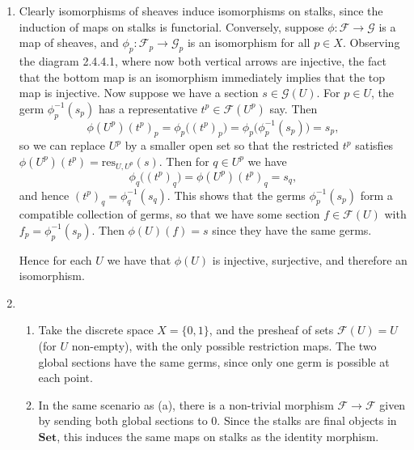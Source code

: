 \documentclass{report}
\newcommand{\cat}[1]{\mathbf{#1}} %
\newcommand{\res}{{\mathrm{res}}} %
\newcommand{\scrF}{\mathscr{F}}
\newcommand{\scrG}{\mathscr{G}}
\begin{document}
\begin{enumerate}[label=\textbf{2.4.\Alph*.}]
	\item Clearly isomorphisms of sheaves induce isomorphisms on stalks, since
	      the induction of maps on stalks is functorial. Conversely, suppose
	      $\phi:\scrF\to\scrG$ is a map of sheaves, and $\phi_p:\scrF_p\to\scrG_p$ is an
	      isomorphism for all $p\in X$. Observing the diagram 2.4.4.1, where now
	      both vertical arrows are injective, the fact that the bottom map is an
	      isomorphism immediately implies that the top map is injective. Now
	      suppose we have a section $s\in\scrG(U)$. For $p\in U$, the germ
	      $\phi_p^{-1}(s_p)$ has a representative $t^p\in\scrF(U^p)$ say. Then
	      \begin{equation*}
		      \phi(U^p)(t^p)_p
		      = \phi_p\bigl((t^p)_p\bigr)
		      = \phi_p\bigl(\phi_p^{-1}(s_p)\bigr)
		      = s_p,
	      \end{equation*}
	      so we can replace $U^p$ by a smaller open set so that the restricted
	      $t^p$ satisfies $\phi(U^p)(t^p)=\res_{U,U^p}(s)$. Then for $q\in U^p$
	      we have
	      \begin{equation*}
		      \phi_q\bigl((t^p)_q\bigr)
		      = \phi(U^p)(t^p)_q
		      = s_q,
	      \end{equation*}
	      and hence $(t^p)_q=\phi_q^{-1}(s_q)$. This shows that the germs
	      $\phi_p^{-1}(s_p)$ form a compatible collection of germs, so that we
	      have some section $f\in\scrF(U)$ with $f_p=\phi_p^{-1}(s_p)$. Then
	      $\phi(U)(f)=s$ since they have the same germs.

	      Hence for each $U$ we have that $\phi(U)$ is injective, surjective,
	      and therefore an isomorphism.

	\item
	      \begin{enumerate}[label=(\alph*)]
		      \item Take the discrete space $X=\{0,1\}$, and the presheaf of sets
		            $\scrF(U)=U$ (for $U$ non-empty), with the only possible
		            restriction maps. The two global sections have the same germs,
		            since only one germ is possible at each point.

		      \item In the same scenario as (a), there is a non-trivial morphism
		            $\scrF\to\scrF$ given by sending both global sections to 0. Since the
		            stalks are final objects in $\cat{Set}$, this induces the same
		            maps on stalks as the identity morphism.


\end{enumerate}
\end{enumerate}
\end{document}

